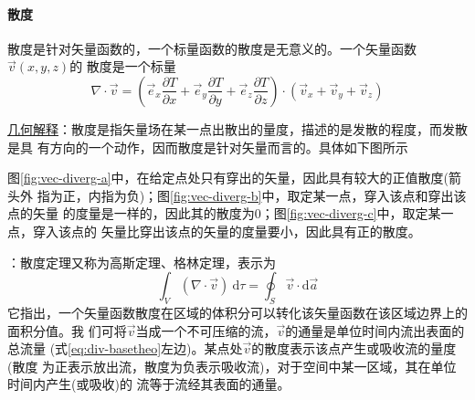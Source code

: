 \paragraph*{散度}
散度是针对矢量函数的，一个标量函数的散度是无意义的。一个矢量函数$\vec{v}(x, y, z)$的
散度是一个标量
\begin{equation}
    \nabla \cdot \vec{v} = (   \vec{e}_x \frac{\partial T}{\partial x} 
                             + \vec{e}_y \frac{\partial T}{\partial y}
                             + \vec{e}_z \frac{\partial T}{\partial z})
                           \cdot
                           (\vec{v}_x + \vec{v}_y + \vec{v}_z)
    \label{eq:vec-devergence}
\end{equation}

\uline{几何解释}：散度是指矢量场在某一点出散出的量度，描述的是发散的程度，而发散是具
有方向的一个动作，因而散度是针对矢量而言的。具体如下图所示
\begin{figure}[ht]
    \centering
    \setlength{\abovecaptionskip}{0.2cm}
    \subfloat[]{
        
        \label{fig:vec-diverg-a}
    }
    \hfill
    \subfloat[]{
        
        \label{fig:vec-diverg-b}
    }
    \hfill
    \subfloat[]{
        
        \label{fig:vec-diverg-c}
    }
    \caption{}
    \label{fig:vec-diverg}
\end{figure}
\newline
图\ref{fig:vec-diverg-a}中，在给定点处只有穿出的矢量，因此具有较大的正值散度(箭头外
指为正，内指为负)；图\ref{fig:vec-diverg-b}中，取定某一点，穿入该点和穿出该点的矢量
的度量是一样的，因此其的散度为0；图\ref{fig:vec-diverg-c}中，取定某一点，穿入该点的
矢量比穿出该点的矢量的度量要小，因此具有正的散度。

：散度定理又称为高斯定理、格林定理，表示为
\begin{equation}
    \int_{V} (\nabla \cdot \vec{v})\ \mathrm{d} \tau
                         = \oint_{S} \vec{v} \cdot \mathrm{d} \vec{a}
    \label{eq:div-basetheo}
\end{equation}
它指出，一个矢量函数散度在区域的体积分可以转化该矢量函数在该区域边界上的面积分值。我
们可将$\vec{v}$当成一个不可压缩的流，$\vec{v}$的通量是单位时间内流出表面的总流量
(式\eqref{eq:div-basetheo}左边)。某点处$\vec{v}$的散度表示该点产生或吸收流的量度(散度
为正表示放出流，散度为负表示吸收流)，对于空间中某一区域，其在单位时间内产生(或吸收)的
流等于流经其表面的通量。


